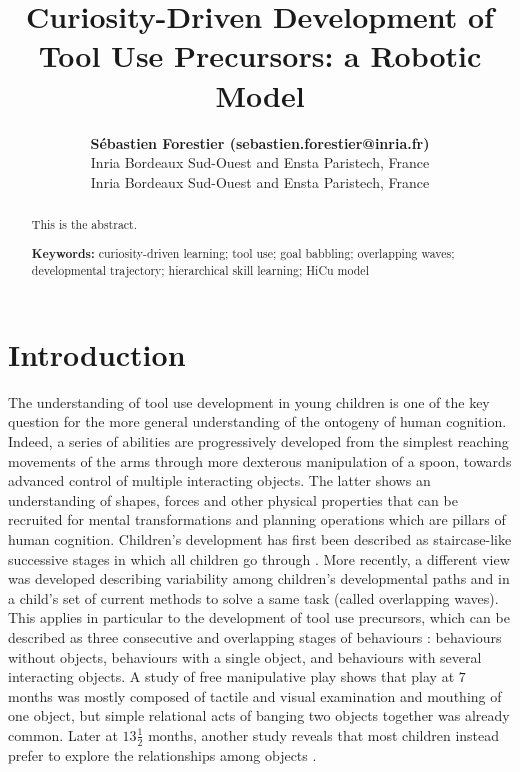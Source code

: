 \documentclass[10pt,letterpaper]{article}
\title{Curiosity-Driven Development of Tool Use Precursors: a Robotic Model}
\author{{\large \bf S\'ebastien Forestier (sebastien.forestier@inria.fr)} \\
	Inria Bordeaux Sud-Ouest and Ensta Paristech, France
  \AND {\large \bf Pierre-Yves Oudeyer (pierre-yves.oudeyer@inria.fr)} \\
	Inria Bordeaux Sud-Ouest and Ensta Paristech, France}
\begin{document}
\maketitle


\begin{abstract}
This is the abstract.

\textbf{Keywords:} 
curiosity-driven learning; tool use; goal babbling; overlapping waves; developmental trajectory; hierarchical skill learning; HiCu model
\end{abstract}


\section{Introduction}

	
	The understanding of tool use development in young children is one of the key question for the more general understanding of the ontogeny of human cognition.
	Indeed, a series of abilities are progressively developed from the simplest reaching movements of the arms through more dexterous manipulation of a spoon, towards advanced control of multiple interacting objects.
	The latter shows an understanding of shapes, forces and other physical properties that can be recruited for mental transformations and planning operations which are pillars of human cognition.
	Children's development has first been described as staircase-like successive stages in which all children go through \cite{piaget1952origins}.
	More recently, a different view was developed \cite{siegler1996emerging} describing variability among children's developmental paths and in a child's set of current methods to solve a same task (called overlapping waves). 
	This applies in particular to the development of tool use precursors, which can be described as three consecutive and overlapping stages of behaviours \cite{guerin2013survey}: 
	behaviours without objects, behaviours with a single object, and behaviours with several interacting objects.
	A study of free manipulative play \cite{fenson1976developmental} shows that play at $7$ months was mostly composed of tactile and visual examination and mouthing of one object, 
	but simple relational acts of banging two objects together was already common.
	Later at $13\frac{1}{2}$ months, another study reveals that most children instead prefer to explore the relationships
	among objects \cite{Zelazo198095}.
	
\end{document}
